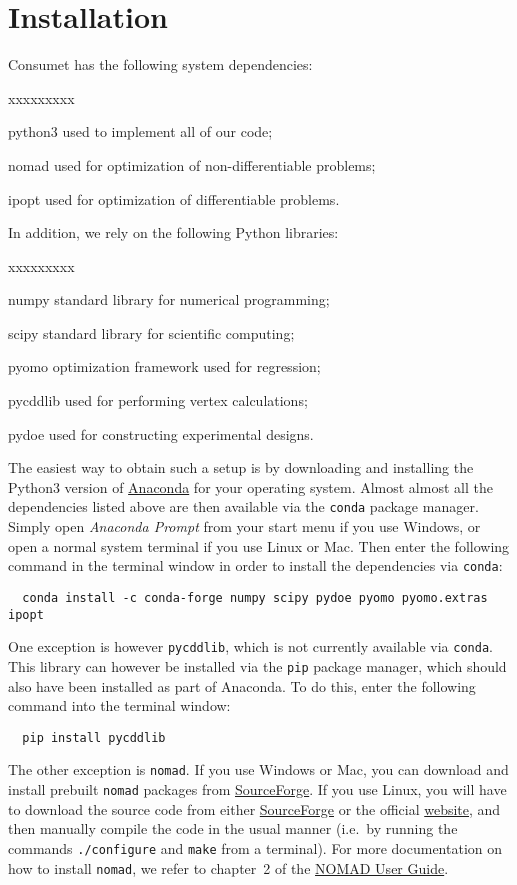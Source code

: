 \documentclass[a4paper,bibliography=numbered]{scrartcl}
\begin{document}
\section{Installation}
Consumet has the following system dependencies:
\begin{labeling}{xxxxxxxxx}
	\item[python3]
		used to implement all of our code;
	\item[nomad]
		used for optimization of non-differentiable problems;
	\item[ipopt]
		used for optimization of differentiable problems.
\end{labeling}
In addition, we rely on the following Python libraries:
\begin{labeling}{xxxxxxxxx}
	\item[numpy]
		standard library for numerical programming;
	\item[scipy] 
		standard library for scientific computing;
	\item[pyomo] 
		optimization framework used for regression;
	\item[pycddlib] 
		used for performing vertex calculations;
	\item[pydoe] 
		used for constructing experimental designs.
\end{labeling}
The easiest way to obtain such a setup is by downloading and installing the Python3 version of \href{https://www.anaconda.com/distribution/}{Anaconda} for your operating system.
Almost almost all the dependencies listed above are then available via the \texttt{conda} package manager.
Simply open \emph{Anaconda Prompt} from your start menu if you use Windows, or open a normal system terminal if you use Linux or Mac.
Then enter the following command in the terminal window in order to install the dependencies via \texttt{conda}:
\begin{lstlisting}
  conda install -c conda-forge numpy scipy pydoe pyomo pyomo.extras ipopt
\end{lstlisting}
One exception is however \texttt{pycddlib}, which is not currently available via \texttt{conda}.
This library can however be installed via the \texttt{pip} package manager, which should also have been installed as part of Anaconda.
To do this, enter the following command into the terminal window:
\begin{lstlisting}
  pip install pycddlib
\end{lstlisting}
The other exception is \texttt{nomad}.
If you use Windows or Mac, you can download and install prebuilt \texttt{nomad} packages from \href{https://sourceforge.net/projects/nomad-bb-opt/files/}{SourceForge}.
If you use Linux, you will have to download the source code from either \href{https://sourceforge.net/projects/nomad-bb-opt/files/}{SourceForge} or the official \href{https://www.gerad.ca/nomad/}{website}, and then manually compile the code in the usual manner (i.e.\ by running the commands \texttt{./configure} and \texttt{make} from a terminal).
For more documentation on how to install \texttt{nomad}, we refer to chapter~2 of the \href{https://sourceforge.net/projects/nomad-bb-opt/files/user_guide.pdf/download}{NOMAD User Guide}.
\end{document}
